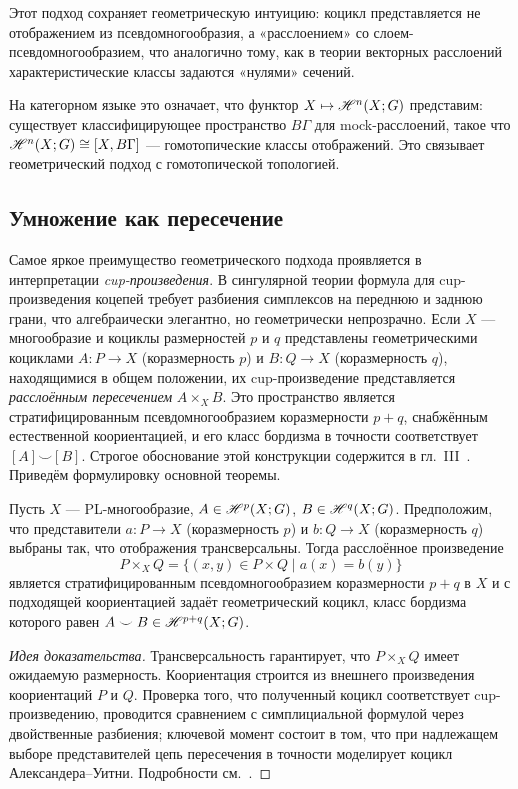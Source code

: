 \documentclass[12pt, twoside]{article}
\begin{document}

Этот подход сохраняет геометрическую интуицию: коцикл представляется не отображением из псевдомногообразия, а «расслоением» со слоем-псев\-дом\-но\-го\-об\-ра\-зи\-ем, что аналогично тому, как в теории векторных расслоений характеристические классы задаются «нулями» сечений.

На категорном языке это означает, что функтор $X \mapsto \mathscr{H}^n(X;G)$ представим: существует классифицирующее пространство $B\Gamma$ для mock-расслоений, такое что $\mathscr{H}^n(X;G) \cong [X, B\Gamma]$ — гомотопические классы отображений. Это связывает геометрический подход с гомотопической топологией.

\subsection{Умножение как пересечение}

Самое яркое преимущество геометрического подхода проявляется в интерпретации \emph{cup-произведения}. В сингулярной теории формула для cup-произведения коцепей требует разбиения симплексов на переднюю и заднюю грани, что алгебраически элегантно, но геометрически непрозрачно. Если $X$ --- многообразие и коциклы размерностей $p$ и $q$ представлены геометрическими коциклами $A \colon P \to X$ (коразмерность $p$) и $B \colon Q \to X$ (коразмерность $q$), находящимися в общем положении, их cup-произведение представляется \emph{расслоённым пересечением} $A \times_X B$. Это пространство является стратифицированным псевдомногообразием коразмерности $p+q$, снабжённым естественной коориентацией, и его класс бордизма в точности соответствует $[A] \smile [B]$. Строгое обоснование этой конструкции содержится в гл.~III~\cite{BRS}. Приведём формулировку основной теоремы.

\begin{theorem}\label{thm:cup}
Пусть $X$ --- PL-многообразие, $A \in \mathscr{H}^p(X;G)$, $B \in \mathscr{H}^q(X;G)$. Предположим, что представители $a: P \to X$ (коразмерность $p$) и $b: Q \to X$ (коразмерность $q$) выбраны так, что отображения трансверсальны. Тогда расслоённое произведение
\begin{equation}\label{eq:fibreproduct}
P \times_X Q = \{(x,y) \in P \times Q \mid a(x) = b(y)\}
\end{equation}
является стратифицированным псевдомногообразием коразмерности $p+q$ в $X$ и с подходящей коориентацией задаёт геометрический коцикл, класс бордизма которого равен $A \smile B \in \mathscr{H}^{p+q}(X;G)$.
\end{theorem}
\begin{proof}[Идея доказательства]
Трансверсальность гарантирует, что $P \times_X Q$ имеет ожидаемую размерность. Коориентация строится из внешнего произведения коориентаций $P$ и $Q$. Проверка того, что полученный коцикл соответствует cup-произведению, проводится сравнением с симплициальной формулой через двойственные разбиения; ключевой момент состоит в том, что при надлежащем выборе представителей цепь пересечения в точности моделирует коцикл Александера–Уитни. Подробности см.~\cite[Гл.~III, §4]{BRS}.
\end{proof}
\end{document}
